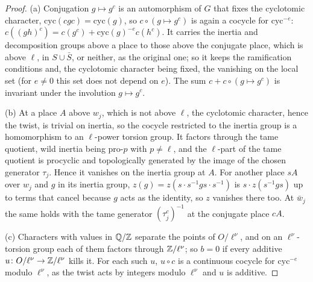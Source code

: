 \begin{proof}
(a) Conjugation $g\mapsto g^c$ is an automorphism of $G$ that fixes the cyclotomic character, $\mathrm{cyc}(cgc)=\mathrm{cyc}(g)$, so $c\circ(g\mapsto g^c)$ is again a cocycle for $\mathrm{cyc}^{-e}$: $c((gh)^c)=c(g^c)+\mathrm{cyc}(g)^{-e}c(h^c)$. It carries the inertia and decomposition groups
above a place to those above the conjugate place, which is above $\ell$, in $S\cup\bar S$, or neither, as the original one; so it keeps the ramification conditions and, the cyclotomic character being fixed, the vanishing on the
local set (for $e\ne0$ this set does not depend on $e$). The sum $c+c\circ(g\mapsto g^c)$ is invariant under the involution $g\mapsto g^c$.

(b) At a place $A$ above $w_j$, which is not above $\ell$, the cyclotomic character, hence the twist, is trivial on inertia, so the cocycle restricted to the inertia group is a homomorphism to an $\ell$-power torsion group. It factors
through the tame quotient, wild inertia being pro-$p$ with $p\ne\ell$, and the $\ell$-part of the tame quotient is procyclic and topologically generated by the image of the chosen generator $\tau_j$. Hence it vanishes on the inertia
group at $A$. For another place $sA$ over $w_j$ and $g$ in its inertia group, $z(g)=z(s\cdot s^{-1}gs\cdot s^{-1})$ is $s\cdot z(s^{-1}gs)$ up to terms that cancel because $g$ acts as the identity, so $z$ vanishes there too. At $\bar w_j$ the same holds with the tame
generator $(\tau_j^c)^{-1}$ at the conjugate place $cA$.

(c) Characters with values in $\mathbb{Q}/\mathbb{Z}$ separate the points of $O/\ell^\nu$, and on an $\ell^\nu$-torsion group each of them factors through $\mathbb{Z}/\ell^\nu$; so $b=0$ if every additive $u\colon O/\ell^\nu\to\mathbb{Z}/\ell^\nu$ kills it. For each such $u$, $u\circ c$ is a continuous
cocycle for $\mathrm{cyc}^{-e}$ modulo $\ell^\nu$, as the twist acts by integers modulo $\ell^\nu$ and $u$ is additive.
\end{proof}

